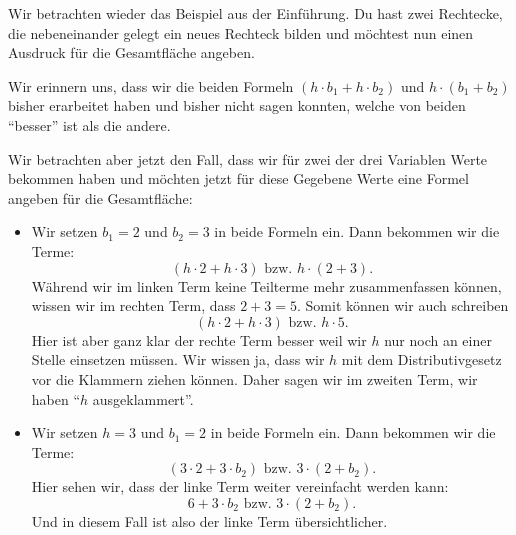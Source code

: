 \documentclass[../../main.tex]{subfiles}
\begin{document}
	\begin{example}
		Wir betrachten wieder das Beispiel aus der Einführung. Du hast zwei Rechtecke, die nebeneinander gelegt
		ein neues Rechteck bilden und möchtest nun einen Ausdruck für die Gesamtfläche angeben.
		\begin{center}
        \end{center}
		Wir erinnern uns, dass wir die beiden Formeln $(h\cdot b_1 + h\cdot b_2)$ und $h\cdot (b_1+b_2)$
		bisher erarbeitet haben und bisher nicht sagen konnten, welche von beiden \enquote{besser} ist als die
		andere.

		Wir betrachten aber jetzt den Fall, dass wir für zwei der drei Variablen Werte bekommen haben und möchten
		jetzt für diese Gegebene Werte eine Formel angeben für die Gesamtfläche:
		\begin{itemize}
			\item Wir setzen $b_1=2$ und $b_2=3$ in beide Formeln ein. Dann bekommen wir die Terme:
				\[(h\cdot 2 + h\cdot 3) \text{ bzw. } h\cdot(2+3).\]
				Während wir im linken Term keine Teilterme mehr zusammenfassen können, wissen wir im rechten Term, dass $2+3=5$.
				Somit können wir auch schreiben
				\[(h\cdot 2 + h\cdot 3) \text{ bzw. } h\cdot 5.\]
				Hier ist aber ganz klar der rechte Term besser weil wir $h$ nur noch an einer Stelle einsetzen müssen.
				Wir wissen ja, dass wir $h$ mit dem Distributivgesetz vor die Klammern ziehen können. Daher sagen wir
				im zweiten Term, wir haben \enquote{$h$ ausgeklammert}.
			\item Wir setzen $h=3$ und $b_1=2$ in beide Formeln ein. Dann bekommen wir die Terme:
				\[(3\cdot2+3\cdot b_2) \text{ bzw. } 3\cdot(2+b_2).\]
				Hier sehen wir, dass der linke Term weiter vereinfacht werden kann:
				\[6+3\cdot b_2 \text{ bzw. } 3\cdot(2+b_2).\]
				Und in diesem Fall ist also der linke Term übersichtlicher.
		\end{itemize}
	\end{example}
\end{document}
